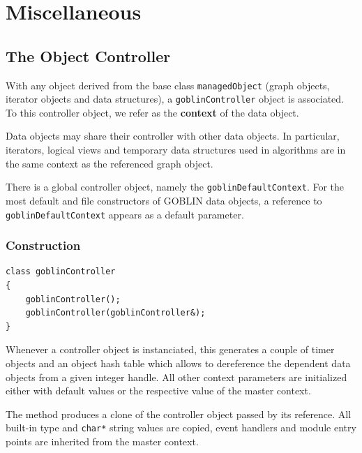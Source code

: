 \documentclass[a4paper,11pt,twoside]{book}
\begin{document}
\part{Miscellaneous}
\begin{multicols}{2}

\chapter{The Object Controller}
\thispagestyle{fancy}
\label{clb7}

With any object derived from the base class \verb/managedObject/ (graph
objects, iterator objects and data structures), a \verb/goblinController/
object is associated. To this controller object, we refer as the {\bf context}
of the data object.

Data objects may share their controller with other data objects. In particular,
iterators, logical views and temporary data structures used in algorithms are
in the same context as the referenced graph object.

There is a global controller object, namely the \verb/goblinDefaultContext/.
For the most default and file constructors of GOBLIN data objects, a reference
to \verb/goblinDefaultContext/ appears as a default parameter.



\section{Construction}
\begin{mymethods}
\begin{verbatim}
class goblinController
{
    goblinController();
    goblinController(goblinController&);
}
\end{verbatim}
\end{mymethods}
Whenever a controller object is instanciated, this generates a couple of
timer objects and an object hash table which allows to dereference the dependent
data objects from a given integer handle. All other context parameters are
initialized either with default values or the respective value of the master
context.

The  method produces a clone of the controller object
passed by its reference. All built-in type and \verb/char*/ string values are
copied, event handlers and module entry points are inherited from the master
context.


\end{multicols}
\end{document}

